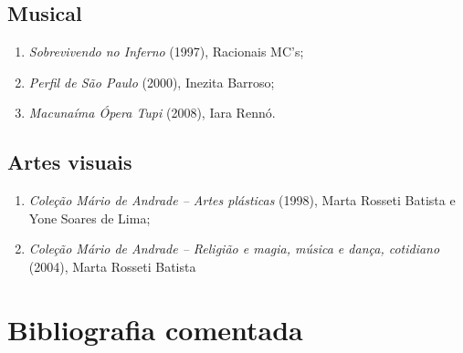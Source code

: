 \documentclass[12pt]{extarticle}
\begin{document}
\subsection{Musical}

\begin{enumerate}
\item
  \emph{Sobrevivendo no Inferno} (1997), Racionais MC's;
\item
  \emph{Perfil de São Paulo} (2000), Inezita Barroso;
\item
  \emph{Macunaíma Ópera Tupi} (2008), Iara Rennó.
\end{enumerate}

\subsection{Artes visuais}

\begin{enumerate}
\item
  \emph{Coleção Mário de Andrade -- Artes plásticas} (1998), Marta
  Rosseti Batista e Yone Soares de Lima;
\item
  \emph{Coleção Mário de Andrade -- Religião e magia, música e dança,
  cotidiano} (2004), Marta Rosseti Batista
\end{enumerate}

\section{Bibliografia comentada}
\end{document}
